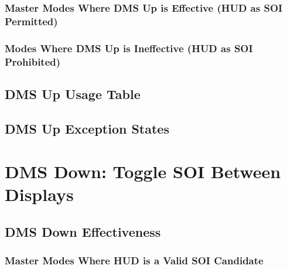 \documentclass[11pt, a4paper, twoside]{report}
\begin{document}
\subsubsection{Master Modes Where DMS Up is Effective (HUD as SOI Permitted)}

\subsubsection{Modes Where DMS Up is Ineffective (HUD as SOI Prohibited)}

\subsection{DMS Up Usage Table}

\subsection{DMS Up Exception States}

\section{DMS Down: Toggle SOI Between Displays}

\subsection{DMS Down Effectiveness}

\subsubsection{Master Modes Where HUD is a Valid SOI Candidate}
\end{document}
